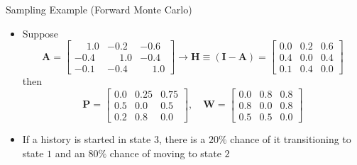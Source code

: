 \documentclass{beamer}
\newcommand{\phmin}{\ensuremath{\phantom{-}}}
\begin{document}
\begin{frame}{Sampling Example (Forward Monte Carlo)}
  \begin{itemize}
    \item Suppose
  \begin{equation*}
    \mathbf{A} = \begin{bmatrix}
      \phmin 1.0 & -0.2 & -0.6 \\
      -0.4 & \phmin 1.0 & -0.4 \\
      -0.1 & -0.4 & \phmin 1.0 \end{bmatrix} \to
    \mathbf{H} \equiv (\mathbf{I-A}) = \begin{bmatrix}
       0.0 &  0.2 &  0.6 \\
       0.4 &  0.0 &  0.4 \\
       0.1 &  0.4 &  0.0 \end{bmatrix}
  \end{equation*}
    then
  \begin{equation*}
    \mathbf{P} = \begin{bmatrix}
       0.0 & 0.25 & 0.75 \\
       0.5 &  0.0 & 0.5 \\
       0.2 &  0.8 & 0.0 \end{bmatrix}, \quad
    \mathbf{W} = \begin{bmatrix}
       0.0 &  0.8 &  0.8 \\
       0.8 &  0.0 &  0.8 \\
       0.5 &  0.5 &  0.0 \end{bmatrix}
  \end{equation*}
    \vfill
    \item If a history is started in state $3$, there is a $20\%$ chance of
      it transitioning to state $1$ and an $80\%$ chance of moving to state
      $2$
  \end{itemize}
\end{frame}

\end{document}
